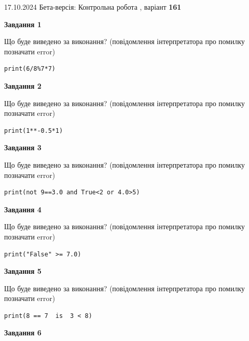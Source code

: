 \documentclass[12pt, ukrainian]{article}
\begin{document}
{\Large{17.10.2024 Бета-версія: Контрольна робота , варіант  \No \textbf { 161 }\par}}
{
\begin {large}
{\begin {center}\textbf{Завдання 1}\end {center}}

Що буде виведено за виконання? (повідомлення інтерпретатора про помилку позначати error)\par
\begin{verbatim}
print(6/8%7*7)
\end{verbatim}

{\begin {center}\textbf{Завдання 2}\end {center}}

Що буде виведено за виконання? (повідомлення інтерпретатора про помилку позначати error)\par
\begin{verbatim}
print(1**-0.5*1)
\end{verbatim}

{\begin {center}\textbf{Завдання 3}\end {center}}

Що буде виведено за виконання? (повідомлення інтерпретатора про помилку позначати error)\par
\begin{verbatim}
print(not 9==3.0 and True<2 or 4.0>5)
\end{verbatim}

{\begin {center}\textbf{Завдання 4}\end {center}}

Що буде виведено за виконання? (повідомлення інтерпретатора про помилку позначати error)\par
\begin{verbatim}
print("False" >= 7.0)
\end{verbatim}

{\begin {center}\textbf{Завдання 5}\end {center}}

Що буде виведено за виконання? (повідомлення інтерпретатора про помилку позначати error)\par
\begin{verbatim}
print(8 == 7  is  3 < 8)
\end{verbatim}

{\begin {center}\textbf{Завдання 6}\end {center}}


\end{large}}
\end{document}
